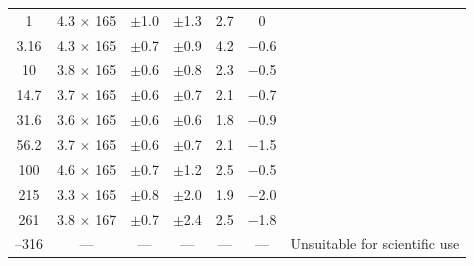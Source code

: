 \begin{table}
\begin{minipage}{\linewidth}
\begin{tabular}{cccccc>{\raggedright}p{1.0in}}
      1             & 4.3    $\times$ 165 & $\pm$1.0  & $\pm$1.3   & 2.7 &    0 & \tabularnewline
      3.16          & 4.3    $\times$ 165 & $\pm$0.7  & $\pm$0.9   & 4.2 & $-$0.6 & \tabularnewline
      10            & 3.8    $\times$ 165 & $\pm$0.6  & $\pm$0.8   & 2.3 & $ -$0.5& \tabularnewline
      14.7          & 3.7    $\times$ 165 & $\pm$0.6  & $\pm$0.7   & 2.1 &  $-$0.7& \tabularnewline
      31.6          & 3.6    $\times$ 165 & $\pm$0.6  & $\pm$0.6   & 1.8 &  $-$0.9& \tabularnewline
      56.2          & 3.7    $\times$ 165 & $\pm$0.6  & $\pm$0.7   & 2.1 & $-$1.5 & \tabularnewline
      100           & 4.6    $\times$ 165 & $\pm$0.7  & $\pm$1.2   & 2.5 & $-$0.5 & \tabularnewline
      215           & 3.3    $\times$ 165 & $\pm$0.8  & $\pm$2.0   & 1.9 & $-$2.0 & \tabularnewline
      261           & 3.8    $\times$ 167 & $\pm$0.7  & $\pm$2.4   & 2.5 & $-$1.8 & \tabularnewline\addlinespace
      1000--316     & ---              & ---       & ---      & --- & --- & Unsuitable for scientific use\tabularnewline
      \bottomrule
    \end{tabular}
    \end{minipage}
\end{table}
